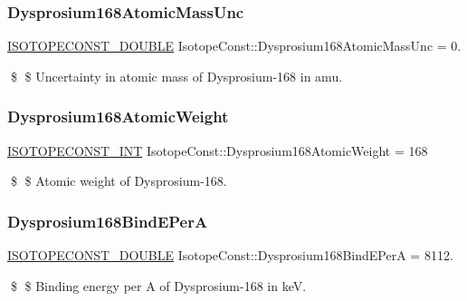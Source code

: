 \subsubsection{\texorpdfstring{Dysprosium168\+Atomic\+Mass\+Unc}{Dysprosium168AtomicMassUnc}}
{\footnotesize\ttfamily \mbox{\hyperlink{group___isotope_const-_macros_ga8f45a7272ce02c0b4c65c44636ed719a}{I\+S\+O\+T\+O\+P\+E\+C\+O\+N\+S\+T\+\_\+\+D\+O\+U\+B\+LE}} Isotope\+Const\+::\+Dysprosium168\+Atomic\+Mass\+Unc = 0.}

\$ \$ Uncertainty in atomic mass of Dysprosium-\/168 in amu. \mbox{\label{group___isotope_const-_dysprosium-_dy168_ga5c5d76c2a9524d075e2c8819d613e5e8}} 
\subsubsection{\texorpdfstring{Dysprosium168\+Atomic\+Weight}{Dysprosium168AtomicWeight}}
{\footnotesize\ttfamily \mbox{\hyperlink{group___isotope_const-_macros_ga5f18360b3e99483a35c32d789e62621c}{I\+S\+O\+T\+O\+P\+E\+C\+O\+N\+S\+T\+\_\+\+I\+NT}} Isotope\+Const\+::\+Dysprosium168\+Atomic\+Weight = 168}

\$ \$ Atomic weight of Dysprosium-\/168. \mbox{\label{group___isotope_const-_dysprosium-_dy168_ga8cd14efa6142767029c844635cb51597}} 
\subsubsection{\texorpdfstring{Dysprosium168\+Bind\+E\+PerA}{Dysprosium168BindEPerA}}
{\footnotesize\ttfamily \mbox{\hyperlink{group___isotope_const-_macros_ga8f45a7272ce02c0b4c65c44636ed719a}{I\+S\+O\+T\+O\+P\+E\+C\+O\+N\+S\+T\+\_\+\+D\+O\+U\+B\+LE}} Isotope\+Const\+::\+Dysprosium168\+Bind\+E\+PerA = 8112.}

\$ \$ Binding energy per A of Dysprosium-\/168 in keV. \mbox{\label{group___isotope_const-_dysprosium-_dy168_ga7b1aa2377c1566ee5d83e86504a8f4c4}} 
